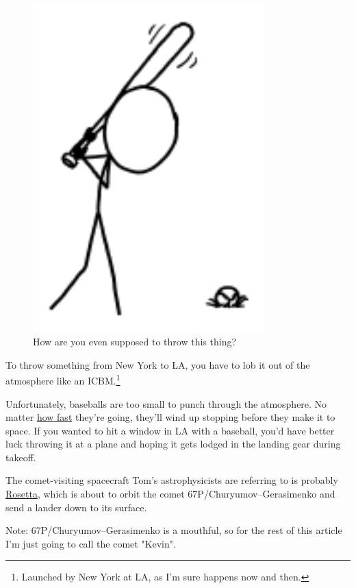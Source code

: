 {\begin{figure}[!htbp]
\centering
\includegraphics[scale=0.5, max width=0.8\textwidth]{imgs/a/82/rosetta_baseball.png}
\caption{How are you even supposed to throw this thing?}
\end{figure}

{To throw something from New York to LA, you have to lob it out of the atmosphere like an ICBM.{\footnote{Launched by New York at LA, as I'm sure happens now and then.} } }

{Unfortunately, baseballs are too small to punch through the atmosphere. No matter \href{http://what-if.xkcd.com/1/}{how fast} they're going, they'll wind up stopping before they make it to space. If you wanted to hit a window in LA with a baseball, you'd have better luck throwing it at a plane and hoping it gets lodged in the landing gear during takeoff.}

{The comet-visiting spacecraft Tom's astrophysicists are referring to is probably \href{http://www.esa.int/Our\_Activities/Space\_Science/Rosetta}{Rosetta}, which is about to orbit the comet 67P/Churyumov–Gerasimenko and send a lander down to its surface.}

{Note: 67P/Churyumov–Gerasimenko is a mouthful, so for the rest of this article I'm just going to call the comet "Kevin".}

}
